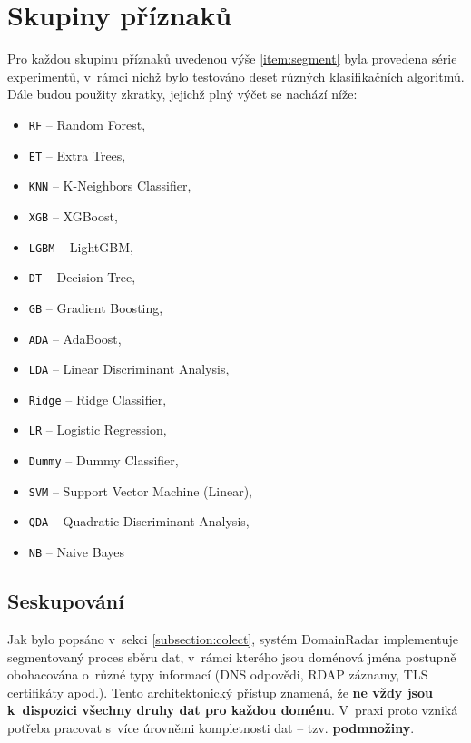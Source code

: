 \section{Skupiny příznaků}


Pro každou skupinu příznaků uvedenou výše \ref{item:segment} byla provedena série experimentů, v~rámci nichž bylo testováno deset různých klasifikačních algoritmů. Dále budou použity zkratky, jejichž plný výčet se nachází níže:

\begin{itemize}
    \item \texttt{RF} – Random Forest,
    \item \texttt{ET} – Extra Trees,
    \item \texttt{KNN} – K-Neighbors Classifier,
    \item \texttt{XGB} – XGBoost,
    \item \texttt{LGBM} – LightGBM,
    \item \texttt{DT} – Decision Tree,
    \item \texttt{GB} – Gradient Boosting,
    \item \texttt{ADA} – AdaBoost,
    \item \texttt{LDA} – Linear Discriminant Analysis,
    \item \texttt{Ridge} – Ridge Classifier,
    \item \texttt{LR} – Logistic Regression,
    \item \texttt{Dummy} – Dummy Classifier,
    \item \texttt{SVM} – Support Vector Machine (Linear),
    \item \texttt{QDA} – Quadratic Discriminant Analysis,
    \item \texttt{NB} – Naive Bayes
\end{itemize}


\subsection{Seskupování}

Jak bylo popsáno v~sekci \ref{subsection:colect}, systém DomainRadar implementuje segmentovaný proces sběru dat, v~rámci kterého jsou doménová jména postupně obohacována o~různé typy informací (DNS odpovědi, RDAP záznamy, TLS certifikáty apod.). Tento architektonický přístup znamená, že \textbf{ne vždy jsou k~dispozici všechny druhy dat pro každou doménu}.  
V~praxi proto vzniká potřeba pracovat s~více úrovněmi kompletnosti dat – tzv. \textbf{podmnožiny}.

